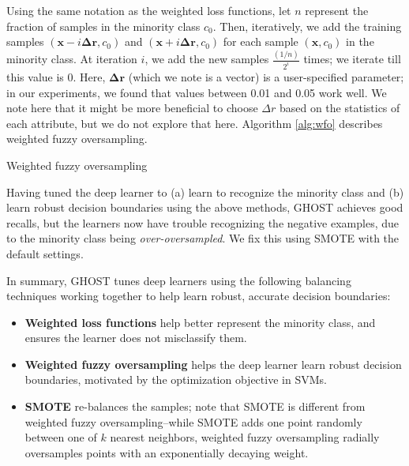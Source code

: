 \documentclass[10pt,compsoc,twocolumn]{IEEEtran}
\begin{document}
Using the same notation as the weighted loss functions, let $n$ represent the fraction of samples in the minority class $c_0$. Then, iteratively, we add the training samples $(\textbf{x} - i \boldsymbol{\Delta r}, c_0)$ and $(\textbf{x} + i\boldsymbol{\Delta r}, c_0)$ for each sample $(\textbf{x}, c_0)$ in the minority class. At iteration $i$, we add the new samples $\frac{(1 / n)}{2^i}$ times; we iterate till this value is 0. Here, $\boldsymbol{\Delta r}$ (which we note is a vector) is a user-specified parameter; in our experiments, we found that values between 0.01 and 0.05 work well. We note here that it might be more beneficial to choose $\Delta r$ based on the statistics of each attribute, but we do not explore that here. Algorithm \ref{alg:wfo} describes weighted fuzzy oversampling.

\begin{algorithm}[h]
\footnotesize
    \SetAlgoLined
    \caption{Weighted fuzzy oversampling}
    \label{alg:wfo}
\end{algorithm}

Having tuned the deep learner to (a) learn to recognize the minority class and (b) learn robust decision boundaries using the above methods, GHOST achieves good recalls, but the learners now have trouble recognizing the negative examples, due to the minority class being \textit{over-oversampled}. We fix this using SMOTE with the default settings.

In summary, GHOST tunes deep learners using the following balancing techniques working together to help learn robust, accurate decision boundaries:
\begin{itemize}
    \item \textbf{Weighted loss functions} help better represent the minority class, and ensures the learner does not misclassify them.
    \item \textbf{Weighted fuzzy oversampling} helps the deep learner learn robust decision boundaries, motivated by the optimization objective in SVMs.
    \item \textbf{SMOTE} re-balances the samples; note that SMOTE is different from weighted fuzzy oversampling--while SMOTE adds one point randomly between one of $k$ nearest neighbors, weighted fuzzy oversampling radially oversamples points with an exponentially decaying weight.
\end{itemize}
\end{document}
